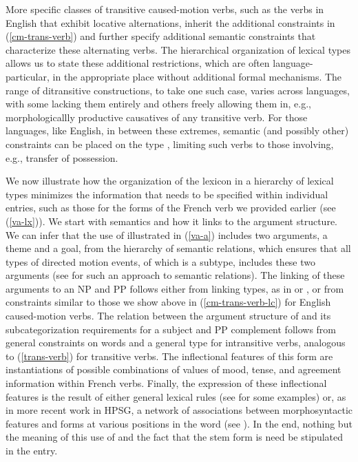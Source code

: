 \documentclass[output=paper]{langsci/langscibook}
\begin{document}
More specific classes of transitive caused-motion verbs, such as the  verbs in English that exhibit locative alternations, inherit the additional constraints in (\ref{cm-trans-verb}) and further specify additional semantic constraints that characterize these alternating verbs.
The hierarchical organization of lexical types allows us to state these additional restrictions, which are often language-particular, in the appropriate place without additional formal mechanisms.
The range of ditransitive constructions, to take one such case, varies across languages, with some lacking them entirely and others freely allowing them in, e.g., morphologicallly productive causatives of any transitive verb.
For those languages, like English, in between these extremes, semantic (and possibly other) constraints can be placed on the type , limiting such verbs to those involving, e.g., transfer of possession.

We now illustrate how the organization of the lexicon in a hierarchy of lexical types minimizes the information that needs to be specified within individual entries, such as those for the forms of the French verb  we provided earlier (see (\ref{va-lx})). We start with semantics and how it links to the argument structure. We can infer that the use of  illustrated in (\ref{va-a}) includes two arguments, a theme and a goal, from the hierarchy of semantic relations, which ensures that all types of directed motion events, of which  is a subtype, includes these two arguments (see \citet{Davis2001} for such an approach to semantic relations). The linking of these arguments to an NP and PP follows either from linking types, as in  or , or from constraints similar to those we show above in (\ref{cm-trans-verb-lc}) for English caused-motion verbs. The relation between the argument structure of  and its subcategorization requirements for a subject and PP complement follows from general constraints on words and a general type for intransitive verbs, analogous to (\ref{trans-verb}) for transitive verbs. The inflectional features of this form are instantiations of possible combinations of values of mood, tense, and agreement information within French verbs. Finally, the expression of these inflectional features is the result of either general lexical rules (see \citet{MillerandSag1997} for some examples) or, as in more recent work in HPSG, a network of associations between morphosyntactic features and forms at various positions in the word (see \citealt{CrysmannandBonami2016}). In the end, nothing but the meaning of this use of  and the fact that the stem form is  need be stipulated in the entry.
\end{document}
